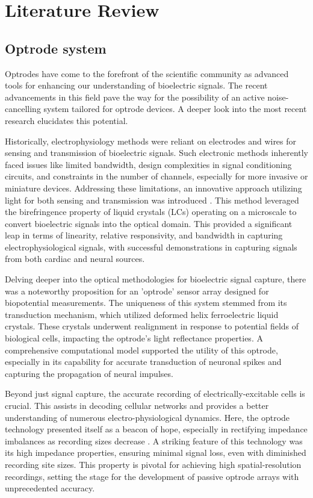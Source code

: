 \chapter{Literature Review}\label{c:literature}

\section{Optrode system}

Optrodes have come to the forefront of the scientific community as advanced tools for enhancing our understanding of bioelectric signals. The recent advancements in this field pave the way for the possibility of an active noise-cancelling system tailored for optrode devices. A deeper look into the most recent research elucidates this potential.

Historically, electrophysiology methods were reliant on electrodes and wires for sensing and transmission of bioelectric signals. Such electronic methods inherently faced issues like limited bandwidth, design complexities in signal conditioning circuits, and constraints in the number of channels, especially for more invasive or miniature devices. Addressing these limitations, an innovative approach utilizing light for both sensing and transmission was introduced \cite{OptrodeTransducer}. This method leveraged the birefringence property of liquid crystals (LCs) operating on a microscale to convert bioelectric signals into the optical domain. This provided a significant leap in terms of linearity, relative responsivity, and bandwidth in capturing electrophysiological signals, with successful demonstrations in capturing signals from both cardiac and neural sources.

Delving deeper into the optical methodologies for bioelectric signal capture, there was a noteworthy proposition for an 'optrode' sensor array designed for biopotential measurements\cite{OptrodeArray}. The uniqueness of this system stemmed from its transduction mechanism, which utilized deformed helix ferroelectric liquid crystals. These crystals underwent realignment in response to potential fields of biological cells, impacting the optrode's light reflectance properties. A comprehensive computational model supported the utility of this optrode, especially in its capability for accurate transduction of neuronal spikes and capturing the propagation of neural impulses.

Beyond just signal capture, the accurate recording of electrically-excitable cells is crucial. This assists in decoding cellular networks and provides a better understanding of numerous electro-physiological dynamics. Here, the optrode technology presented itself as a beacon of hope, especially in rectifying impedance imbalances as recording sizes decrease \cite{ImpedanceOfOptrode}. A striking feature of this technology was its high impedance properties, ensuring minimal signal loss, even with diminished recording site sizes. This property is pivotal for achieving high spatial-resolution recordings, setting the stage for the development of passive optrode arrays with unprecedented accuracy.

